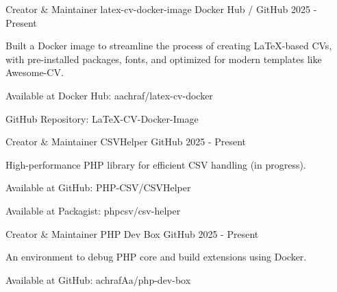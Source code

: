 \newpage


\begin{cventries}

  \cventry
  {Creator \& Maintainer} %
  {latex-cv-docker-image} %
  {Docker Hub / GitHub} %
  {2025 - Present} %
  {
    \begin{cvitems} %
      \item {Built a Docker image to streamline the process of creating LaTeX-based CVs, with pre-installed packages, fonts, and optimized for modern templates like Awesome-CV.}
      \item {Available at Docker Hub: aachraf/latex-cv-docker}
      \item {GitHub Repository: LaTeX-CV-Docker-Image}
    \end{cvitems}
  }

\cventry
{Creator \& Maintainer} %
{CSVHelper} %
{GitHub} %
{2025 - Present} %
{
  \begin{cvitems} %
    \item {High-performance PHP library for efficient CSV handling (in progress).}
    \item {Available at GitHub: PHP-CSV/CSVHelper}
    \item {Available at Packagist: phpcsv/csv-helper}
  \end{cvitems}
}

\cventry
{Creator \& Maintainer} %
{PHP Dev Box} %
{GitHub} %
{2025 - Present} %
{
  \begin{cvitems} %
    \item {An environment to debug PHP core and build extensions using Docker.}
    \item {Available at GitHub: achrafAa/php-dev-box}
  \end{cvitems}
}

\end{cventries} 